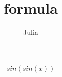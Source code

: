\documentclass{article}
\title{formula}
\author{Julia}
\begin{document}
\maketitle

$$sin(sin(x))$$
\end{document}
